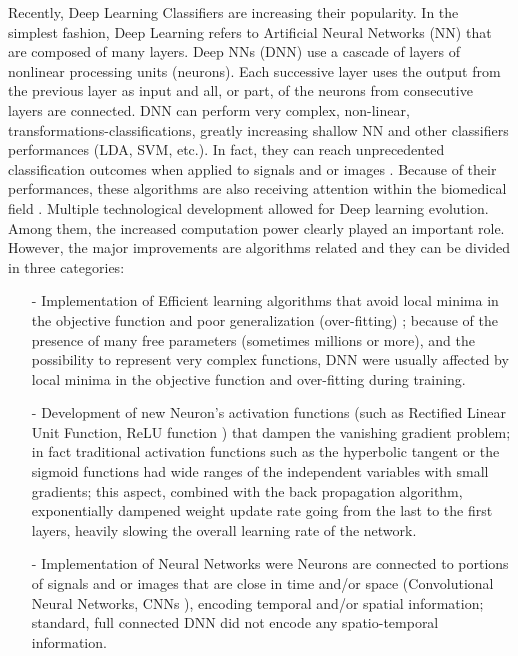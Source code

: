 \documentclass[12pt ]{iopart}
\begin{document}
Recently, Deep Learning Classifiers are increasing their popularity. In the simplest fashion, Deep Learning  refers to Artificial Neural Networks (NN) \parencite{lecun2015deep} that are composed of many layers. Deep NNs (DNN) use a cascade of  layers of nonlinear processing units (neurons). Each successive layer uses the output from the previous layer as input and all, or part, of the neurons from consecutive layers are connected. DNN can perform very complex, non-linear, transformations-classifications, greatly increasing shallow NN \parencite{cheng1994neural} and other classifiers performances (LDA, SVM, etc.). In fact, they can reach unprecedented classification outcomes when applied to signals and or images \parencite{lecun2015deep}. Because of their performances, these algorithms are also receiving  attention within the biomedical field \parencite{deng2014deep}. 
Multiple technological development allowed for Deep learning evolution. 
Among them, the increased computation power clearly played an important role.
However, the major improvements are algorithms related and they can be divided in three  categories:
\begin{itemize}
	\item[-] Implementation of Efficient learning algorithms that avoid local minima in the objective function and poor generalization (over-fitting) \parencite{srivastava2014dropout}; because of the presence of many free parameters (sometimes millions or more), and the possibility to represent very complex functions, DNN were usually affected by local minima in the objective function and over-fitting  during training. 
	\item[-] Development of new Neuron's activation functions (such as Rectified Linear Unit Function, ReLU function \parencite{krizhevsky2012imagenet}) that dampen  the vanishing gradient problem; in fact traditional activation functions such as the hyperbolic tangent or the sigmoid functions had wide ranges of the independent variables with small gradients;  this aspect, combined with the back propagation algorithm, exponentially dampened weight update rate going from the last to the first layers, heavily slowing the overall learning rate of the network.
	\item[-] Implementation of  Neural Networks were Neurons are connected to portions of signals and or images that are close in time and/or space (Convolutional Neural Networks, CNNs \parencite{lecun2015deep}), encoding temporal and/or spatial information; standard, full connected DNN  did not encode any spatio-temporal information.
\end{itemize}
\end{document}
